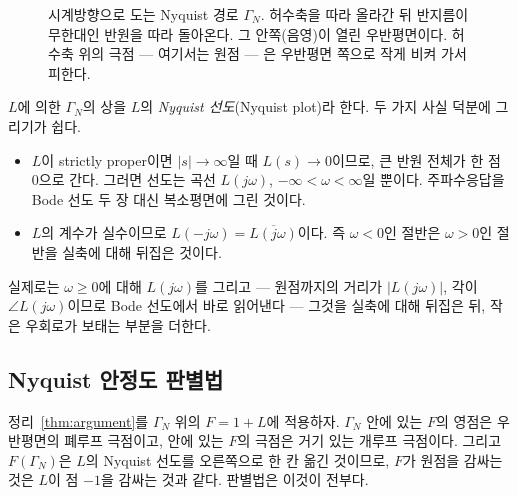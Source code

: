 \documentclass[11pt]{article}
\begin{document}
\begin{figure}[htb]
\centering
{}
\caption{시계방향으로 도는 Nyquist 경로 $\Gamma_N$. 허수축을 따라 올라간 뒤 반지름이
무한대인 반원을 따라 돌아온다. 그 안쪽(음영)이 열린 우반평면이다. 허수축 위의
극점 --- 여기서는 원점 --- 은 우반평면 쪽으로 작게 비켜 가서 피한다.}
\label{fig:contour}
\end{figure}

$L$에 의한 $\Gamma_N$의 상을 $L$의 \emph{Nyquist 선도}(Nyquist plot)라 한다. 두
가지 사실 덕분에 그리기가 쉽다.
\begin{itemize}[leftmargin=*,itemsep=2pt]
\item $L$이 strictly proper이면 $|s|\to\infty$일 때 $L(s)\to0$이므로, 큰 반원 전체가
한 점 $0$으로 간다. 그러면 선도는 곡선 $L(j\omega)$, $-\infty<\omega<\infty$일
뿐이다. 주파수응답을 Bode 선도 두 장 대신 복소평면에 그린 것이다.
\item $L$의 계수가 실수이므로 $L(-j\omega)=\overline{L(j\omega)}$이다. 즉
$\omega<0$인 절반은 $\omega>0$인 절반을 실축에 대해 뒤집은 것이다.
\end{itemize}
실제로는 $\omega\ge0$에 대해 $L(j\omega)$를 그리고 --- 원점까지의 거리가
$|L(j\omega)|$, 각이 $\angle L(j\omega)$이므로 Bode 선도에서 바로 읽어낸다 ---
그것을 실축에 대해 뒤집은 뒤, 작은 우회로가 보태는 부분을 더한다.

\subsection{Nyquist 안정도 판별법}
정리~\ref{thm:argument}를 $\Gamma_N$ 위의 $F=1+L$에 적용하자. $\Gamma_N$ 안에 있는
$F$의 영점은 우반평면의 폐루프 극점이고, 안에 있는 $F$의 극점은 거기 있는 개루프
극점이다. 그리고 $F(\Gamma_N)$은 $L$의 Nyquist 선도를 오른쪽으로 한 칸 옮긴
것이므로, $F$가 원점을 감싸는 것은 $L$이 점 $-1$을 감싸는 것과 같다. 판별법은
이것이 전부다.
\end{document}
